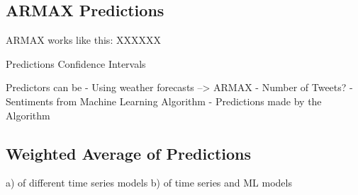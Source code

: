 \subsection{ARMAX Predictions}
ARMAX works like this: 
XXXXXX

Predictions
Confidence Intervals


Predictors can be 
- Using weather forecasts --> ARMAX
- Number of Tweets?
- Sentiments from Machine Learning Algorithm
- Predictions made by the Algorithm



\subsection{Weighted Average of Predictions}
a) of different time series models
b) of time series and ML models